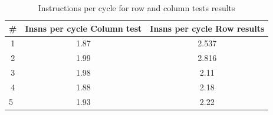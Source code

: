 \documentclass[xcolor=table]{llncs}
\begin{document}
\begin{table}[]
\centering
\caption{Instructions per cycle for row and column tests results}
\label{table6}
\begin{tabular}{ccc}
\hline
\rowcolor[HTML]{000000} 
{\color[HTML]{FFFFFF} \textbf{\#}} & {\color[HTML]{FFFFFF} \textbf{Insns per cycle Column test}} & {\color[HTML]{FFFFFF} \textbf{Insns per cycle Row results}} \\ \hline
1                                  & 1.87                                                        & 2.537                                                       \\
2                                  & 1.99                                                        & 2.816                                                       \\
3                                  & 1.98                                                        & 2.11                                                        \\
4                                  & 1.88                                                        & 2.18                                                        \\
\multicolumn{1}{l}{5}              & 1.93                                                        & 2.22                                                        \\ \hline
\end{tabular}
\end{table} 
%
\end{document}
